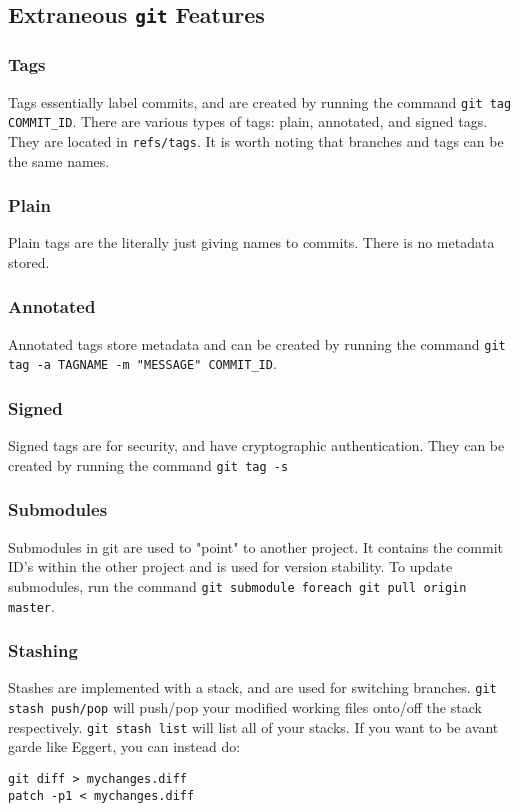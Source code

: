 \documentclass[13pt]{article}
\begin{document}
\subsection{Extraneous \texttt{git} Features}
\subsubsection{Tags}
Tags essentially label commits, and are created by running the command \texttt{git tag COMMIT\_ID}. There are various types of tags: plain, annotated, and signed tags. They are located in \texttt{refs/tags}. It is worth noting that branches and tags can be the same names.

\subsubsection*{Plain}
Plain tags are the literally just giving names to commits. There is no metadata stored.

\subsubsection*{Annotated}
Annotated tags store metadata and can be created by running the command \texttt{git tag -a TAGNAME -m "MESSAGE" COMMIT\_ID}.

\subsubsection*{Signed}
Signed tags are for security, and have cryptographic authentication. They can be created by running the command \texttt{git tag -s}





\subsubsection{Submodules}
Submodules in git are used to "point" to another project. It contains the commit ID's within the other project and is used for version stability. To update submodules, run the command \texttt{git submodule foreach git pull origin master}.





\subsubsection{Stashing}
Stashes are implemented with a stack, and are used for switching branches. \texttt{git stash push/pop} will push/pop your modified working files onto/off the stack respectively. \texttt{git stash list} will list all of your stacks. If you want to be avant garde like Eggert, you can instead do:
\begin{verbatim}
git diff > mychanges.diff
patch -p1 < mychanges.diff
\end{verbatim}
\end{document}
